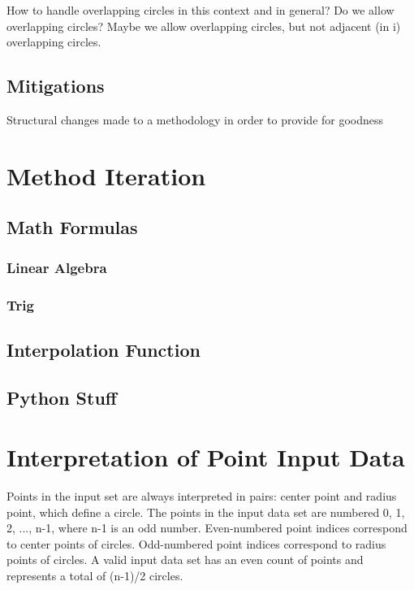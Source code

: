 \documentclass[sigconf]{acmart}
\begin{document}
How to handle overlapping circles in this context and in general? Do we allow overlapping circles? Maybe we allow overlapping circles, but not adjacent (in i) overlapping circles.

\subsection{\textbf{Mitigations}}
Structural changes made to a methodology in order to provide for goodness

\section{Method Iteration}

\subsection{Math Formulas}

\subsubsection{Linear Algebra}

\subsubsection{Trig}

\subsection{Interpolation Function}


\subsection{Python Stuff\cite{GitHub} }



\section{Interpretation of Point Input Data}
Points in the input set are always interpreted in pairs: center point and radius point, which define a circle. The points in the input data set are numbered 0, 1, 2, ..., n-1, where n-1 is an odd number. Even-numbered point indices correspond to center points of circles. Odd-numbered point indices correspond to radius points of circles.  A valid input data set has an even count of points and represents a total of (n-1)/2 circles.
\end{document}
